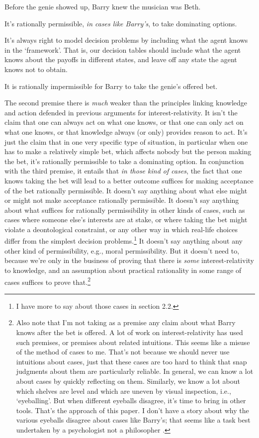 \documentclass[11pt,oneside]{book}
\begin{document}
\begin{enumerate*}
\item Before the genie showed up, Barry knew the musician was Beth.
\item It's rationally permissible, \textit{in cases like Barry's}, to take dominating options.
\item It's always right to model decision problems by including what the agent knows in the `framework'. That is, our decision tables should include what the agent knows about the payoffs in different states, and leave off any state the agent knows not to obtain.
\item It is rationally impermissible for Barry to take the genie's offered bet.
\end{enumerate*}

\noindent The second premise there is \textit{much} weaker than the principles linking knowledge and action defended in previous arguments for interest-relativity. It isn't the claim that one can always act on what one knows, or that one can only act on what one knows, or that knowledge always (or only) provides reason to act. It's just the claim that in one very specific type of situation, in particular when one has to make a relatively simple bet, which affects nobody but the person making the bet, it's rationally permissible to take a dominating option. In conjunction with the third premise, it entails that \textit{in those kind of cases}, the fact that one knows taking the bet will lead to a better outcome suffices for making acceptance of the bet rationally permissible. It doesn't say anything about what else might or might not make acceptance rationally permissible. It doesn't say anything about what suffices for rationally permissibility in other kinds of cases, such as cases where someone else's interests are at stake, or where taking the bet might violate a deontological constraint, or any other way in which real-life choices differ from the simplest decision problems.\footnote{I have more to say about those cases in section 2.2.} It doesn't say anything about any other kind of permissibility, e.g., moral permissibility. But it doesn't need to, because we're only in the business of proving that there is \textit{some} interest-relativity to knowledge, and an assumption about practical rationality in some range of cases suffices to prove that.\footnote{Also note that I'm not taking as a premise any claim about what Barry knows after the bet is offered. A lot of work on interest-relativity has used such premises, or premises about related intuitions. This seems like a misuse of the method of cases to me. That's not because we should never use intuitions about cases, just that these cases are too hard to think that snap judgments about them are particularly reliable. In general, we can know a lot about cases by quickly reflecting on them. Similarly, we know a lot about which shelves are level and which are uneven by visual inspection, i.e., `eyeballing'. But when different eyeballs disagree, it's time to bring in other tools. That's the approach of this paper. I don't have a story about why the various eyeballs disagree about cases like Barry's; that seems like a task best undertaken by a psychologist not a philosopher \citep{Ichikawa2009}.}
\end{document}

